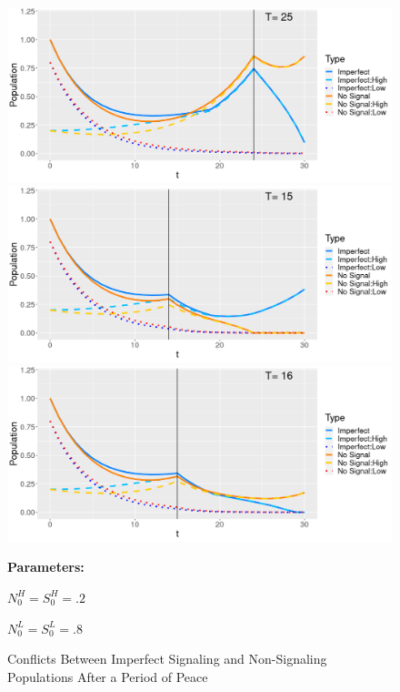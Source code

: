 \begin{figure}[p]
  \caption{Conflicts Between Imperfect Signaling and Non-Signaling Populations After a Period of Peace}
   \label{fig:IFight}
    \includegraphics[width=\textwidth, height=.28\textheight]{Images/Fight_I_NS_Win.png}
    \includegraphics[width=\textwidth, height=.28\textheight]{Images/Fight_I_S_Win.png}
    \includegraphics[width=\textwidth, height=.28\textheight]{Images/Fight_I_Special.png}
 \begin{minipage}[c]{.2\textwidth}
    \textbf{Parameters:}
    \end{minipage}\hfill
    \begin{minipage}[c]{.2\textwidth}
    
    $N_0^H = S_0^H = .2$
    
    $N_0^L = S_0^L = .8$
    

\end{minipage}
\end{figure}
